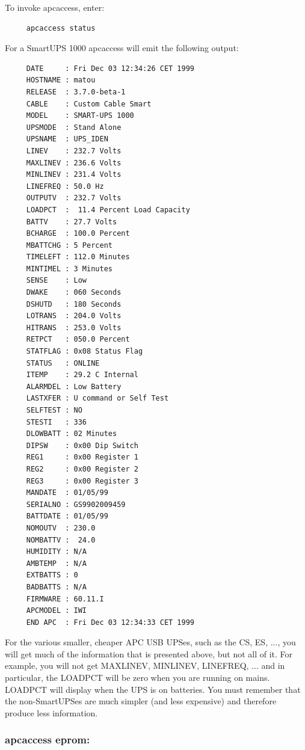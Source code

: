 {{{{To invoke apcaccess, enter: 

\footnotesize
\begin{verbatim}
     apcaccess status
\end{verbatim}
\normalsize

For a SmartUPS 1000 apcaccess will emit the following output: 

\footnotesize
\begin{verbatim}
     DATE     : Fri Dec 03 12:34:26 CET 1999
     HOSTNAME : matou
     RELEASE  : 3.7.0-beta-1
     CABLE    : Custom Cable Smart
     MODEL    : SMART-UPS 1000
     UPSMODE  : Stand Alone
     UPSNAME  : UPS_IDEN
     LINEV    : 232.7 Volts
     MAXLINEV : 236.6 Volts
     MINLINEV : 231.4 Volts
     LINEFREQ : 50.0 Hz
     OUTPUTV  : 232.7 Volts
     LOADPCT  :  11.4 Percent Load Capacity
     BATTV    : 27.7 Volts
     BCHARGE  : 100.0 Percent
     MBATTCHG : 5 Percent
     TIMELEFT : 112.0 Minutes
     MINTIMEL : 3 Minutes
     SENSE    : Low
     DWAKE    : 060 Seconds
     DSHUTD   : 180 Seconds
     LOTRANS  : 204.0 Volts
     HITRANS  : 253.0 Volts
     RETPCT   : 050.0 Percent
     STATFLAG : 0x08 Status Flag
     STATUS   : ONLINE
     ITEMP    : 29.2 C Internal
     ALARMDEL : Low Battery
     LASTXFER : U command or Self Test
     SELFTEST : NO
     STESTI   : 336
     DLOWBATT : 02 Minutes
     DIPSW    : 0x00 Dip Switch
     REG1     : 0x00 Register 1
     REG2     : 0x00 Register 2
     REG3     : 0x00 Register 3
     MANDATE  : 01/05/99
     SERIALNO : GS9902009459
     BATTDATE : 01/05/99
     NOMOUTV  : 230.0
     NOMBATTV :  24.0
     HUMIDITY : N/A
     AMBTEMP  : N/A
     EXTBATTS : 0
     BADBATTS : N/A
     FIRMWARE : 60.11.I
     APCMODEL : IWI
     END APC  : Fri Dec 03 12:34:33 CET 1999
\end{verbatim}
\normalsize

For the various smaller, cheaper APC USB UPSes, such as the CS, ES, ..., you
will get much of the information that is presented above, but not all of it.
For example, you will not get MAXLINEV, MINLINEV, LINEFREQ, ... and in
particular, the LOADPCT will be zero when you are running on mains. LOADPCT
will display when the UPS is on batteries.  You must remember that the
non-SmartUPSes are much simpler (and less expensive) and therefore produce
less information. 

\label{apcaccess-eprom}

\subsubsection*{apcaccess eprom:}

}}}}
